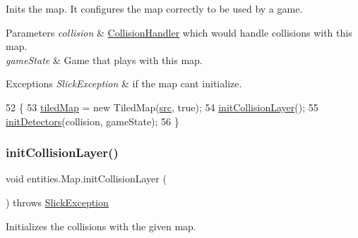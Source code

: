 Inits the map. It configures the map correctly to be used by a game.


\begin{DoxyParams}{Parameters}
{\em collision} & \mbox{\hyperlink{classentities_1_1_collision_handler}{Collision\+Handler}} which would handle collisions with this map. \\
\hline
{\em game\+State} & Game that plays with this map. \\
\hline
\end{DoxyParams}

\begin{DoxyExceptions}{Exceptions}
{\em Slick\+Exception} & if the map can\textquotesingle{}t initialize. \\
\hline
\end{DoxyExceptions}

\begin{DoxyCode}
52                                                                                             \{
53         \mbox{\hyperlink{classentities_1_1_map_a94a743ccd80946422fcbdb5ba1cc966b}{tiledMap}} = \textcolor{keyword}{new} TiledMap(\mbox{\hyperlink{classentities_1_1_map_a15025d8ae6bb3627fb145ce75013b011}{src}}, \textcolor{keyword}{true});
54         \mbox{\hyperlink{classentities_1_1_map_a870dbe1d4cad1c47b3a63a28267c32a9}{initCollisionLayer}}();
55         \mbox{\hyperlink{classentities_1_1_map_a501c11a9a6f076a7a2e8c8880eeceae6}{initDetectors}}(collision, gameState);
56     \}
\end{DoxyCode}
\mbox{\label{classentities_1_1_map_a870dbe1d4cad1c47b3a63a28267c32a9}} 
\subsubsection{\texorpdfstring{init\+Collision\+Layer()}{initCollisionLayer()}}
{\footnotesize\ttfamily void entities.\+Map.\+init\+Collision\+Layer (\begin{DoxyParamCaption}{ }\end{DoxyParamCaption}) throws \mbox{\hyperlink{classorg_1_1newdawn_1_1slick_1_1_slick_exception}{Slick\+Exception}}\hspace{0.3cm}{\ttfamily [inline]}}

Initializes the collisions with the given map.


